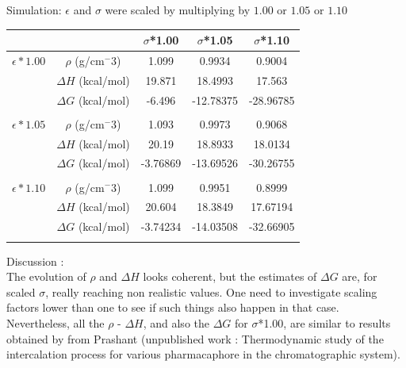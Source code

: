 \documentclass[12pt,a4paper]{article}
\begin{document}
Simulation: $\epsilon$ and $\sigma$ were scaled by multiplying by $1.00$ or $1.05$ or $1.10$

\begin{center}
\begin{tabular}{|c|c|c|c|c|}
\hline  &  & $\sigma$*1.00 & $\sigma$*1.05 & $\sigma$*1.10 \\ 
\hline $\epsilon*1.00$ & $\rho$ (g/cm$^-3$) & 1.099 & 0.9934 & 0.9004 \\ 
\hline  & $\Delta H$ (kcal/mol) & 19.871 & 18.4993 & 17.563 \\ 
\hline  & $\Delta G$ (kcal/mol) & -6.496 & -12.78375 & -28.96785 \\ 
\hline  &  &  &  &  \\ 
\hline $\epsilon*1.05$ & $\rho$ (g/cm$^-3$) & 1.093 & 0.9973 & 0.9068 \\ 
\hline  & $\Delta H$ (kcal/mol) & 20.19 & 18.8933 & 18.0134 \\ 
\hline  & $\Delta G$ (kcal/mol) & -3.76869 & -13.69526 & -30.26755 \\ 
\hline  &  &  &  &  \\ 
\hline $\epsilon*1.10$ & $\rho$ (g/cm$^-3$)& 1.099 & 0.9951 & 0.8999 \\ 
\hline  & $\Delta H$ (kcal/mol) & 20.604 & 18.3849 & 17.67194 \\ 
\hline  & $\Delta G$ (kcal/mol) & -3.74234 & -14.03508 & -32.66905 \\
\hline  &  &  &  &  \\ 
\hline 
\end{tabular} 
\end{center}

Discussion : \\


The evolution of $\rho$ and $\Delta H$ looks coherent, but the estimates of 
$\Delta G$ are, for scaled  $\sigma$, really reaching non realistic values. One need to investigate 
scaling factors lower than one to see if such things also happen in that case.\\



Nevertheless, all the $\rho$ - $\Delta H$, and also the $\Delta G$ for $\sigma$*1.00, are similar 
to results obtained by from Prashant (unpublished work : Thermodynamic study of the intercalation 
process for various
pharmacaphore in the chromatographic system).
\end{document}
